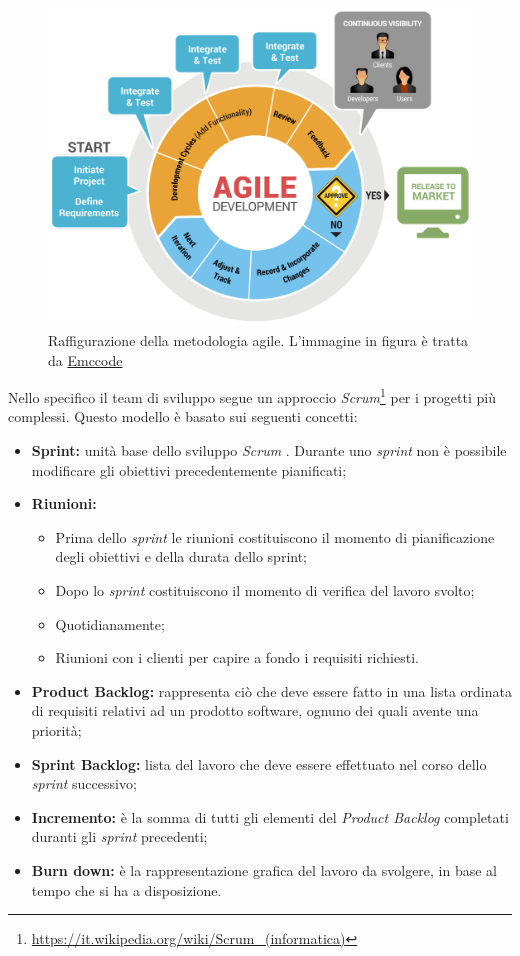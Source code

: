 \begin{figure}[h]
\centering
\includegraphics[width=0.55\linewidth]{immagini/agile}
\caption[Raffigurazione della metodologia agile]{Raffigurazione della metodologia agile. L'immagine in figura è tratta da \href{https://github.com/emccode/training}{Emccode}}
\label{fig:agile}
\end{figure}
Nello specifico il team di sviluppo segue un approccio \textit{Scrum}\footnote{\url{https://it.wikipedia.org/wiki/Scrum_(informatica)}} per i progetti più complessi. Questo modello è basato sui seguenti concetti:
\begin{itemize}
	\item \textbf{Sprint: }unità base dello sviluppo \textit{Scrum }. Durante uno \textit{sprint }non è possibile modificare gli obiettivi precedentemente pianificati;
	\item\textbf{Riunioni: }
	\begin{itemize}
		\item Prima dello \textit{sprint } le riunioni costituiscono il momento di pianificazione degli obiettivi e della durata dello sprint;
		\item Dopo lo \textit{sprint} costituiscono il momento di verifica del lavoro svolto;
		\item Quotidianamente;
		\item Riunioni con i clienti per capire a fondo i requisiti richiesti.
	\end{itemize}
	\item \textbf{Product Backlog: }rappresenta ciò che deve essere fatto in una lista ordinata di requisiti relativi ad un prodotto software, ognuno dei quali avente una priorità;
	\item \textbf{Sprint Backlog: }lista del lavoro che deve essere effettuato nel corso dello \textit{sprint }successivo;
	\item \textbf{Incremento: }è la somma di tutti gli elementi del \textit{Product Backlog }completati duranti gli \textit{sprint} precedenti;
	\item \textbf{Burn down: }è la rappresentazione grafica del lavoro da svolgere, in base al tempo che si ha a disposizione.
\end{itemize}

